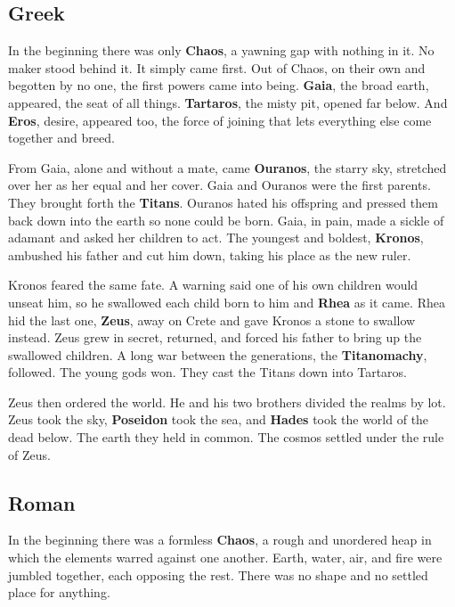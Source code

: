 
\subsection{Greek}

In the beginning there was only \textbf{Chaos}, a yawning gap with nothing
in it. No maker stood behind it. It simply came first. Out of Chaos, on their
own and begotten by no one, the first powers came into being. \textbf{Gaia},
the broad earth, appeared, the seat of all things. \textbf{Tartaros}, the misty
pit, opened far below. And \textbf{Eros}, desire, appeared too, the force of
joining that lets everything else come together and breed.

From Gaia, alone and without a mate, came \textbf{Ouranos}, the starry sky,
stretched over her as her equal and her cover. Gaia and Ouranos were the first
parents. They brought forth the \textbf{Titans}. Ouranos hated his offspring and
pressed them back down into the earth so none could be born. Gaia, in pain, made
a sickle of adamant and asked her children to act. The youngest and boldest,
\textbf{Kronos}, ambushed his father and cut him down, taking his place as the
new ruler.

Kronos feared the same fate. A warning said one of his own children would unseat
him, so he swallowed each child born to him and \textbf{Rhea} as it came. Rhea
hid the last one, \textbf{Zeus}, away on Crete and gave Kronos a stone to swallow
instead. Zeus grew in secret, returned, and forced his father to bring up the
swallowed children. A long war between the generations, the \textbf{Titanomachy},
followed. The young gods won. They cast the Titans down into Tartaros.

Zeus then ordered the world. He and his two brothers divided the realms by lot.
Zeus took the sky, \textbf{Poseidon} took the sea, and \textbf{Hades} took the
world of the dead below. The earth they held in common. The cosmos settled under
the rule of Zeus.

\subsection{Roman}

In the beginning there was a formless \textbf{Chaos}, a rough and unordered heap
in which the elements warred against one another. Earth, water, air, and fire
were jumbled together, each opposing the rest. There was no shape and no settled
place for anything.

